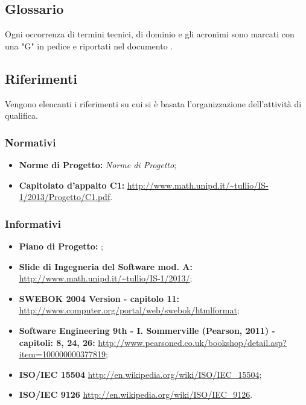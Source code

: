\subsection{Glossario}
Ogni occorrenza di termini tecnici, di dominio e gli acronimi sono marcati con una "G" in pedice e riportati nel documento \Glossario{}.

\subsection{Riferimenti}
Vengono elencanti i riferimenti su cui si è basata l'organizzazione dell'attività di qualifica.
	\subsubsection{Normativi}
		\begin{itemize}
  			\item \textbf{Norme di Progetto:}  \emph{Norme di Progetto};
			\item \textbf{Capitolato d'appalto C1:} \url{http://www.math.unipd.it/~tullio/IS-1/2013/Progetto/C1.pdf}.
		\end{itemize}
	\subsubsection{Informativi}
		\begin{itemize}
  			\item \textbf{Piano di Progetto:} \PianoDiProgetto{};
  			\item \textbf{Slide di Ingegneria del Software mod. A:} \url{http://www.math.unipd.it/~tullio/IS-1/2013/};
  			\item \textbf{SWEBOK 2004 Version - capitolo 11:} \url{http://www.computer.org/portal/web/swebok/htmlformat}; 
  			\item \textbf{Software Engineering 9th - I. Sommerville (Pearson, 2011) - capitoli: 8, 24, 26:} \url{http://www.pearsoned.co.uk/bookshop/detail.asp?item=100000000377819};
  			\item \textbf{ISO/IEC 15504} \url{http://en.wikipedia.org/wiki/ISO/IEC_15504};
			\item \textbf{ISO/IEC 9126} \url{http://en.wikipedia.org/wiki/ISO/IEC_9126}.
		\end{itemize}
	

